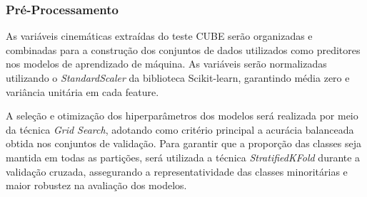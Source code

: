 \documentclass{article}
\begin{document}


\subsubsection{Pré-Processamento}

\noindent As variáveis cinemáticas extraídas do teste CUBE serão organizadas e combinadas para a construção dos conjuntos de dados utilizados como preditores nos modelos de aprendizado de máquina. As variáveis serão normalizadas utilizando o \textit{StandardScaler} da biblioteca Scikit-learn, garantindo média zero e variância unitária em cada feature.

A seleção e otimização dos hiperparâmetros dos modelos será realizada por meio da técnica \textit{Grid Search}, adotando como critério principal a acurácia balanceada obtida nos conjuntos de validação. Para garantir que a proporção das classes seja mantida em todas as partições, será utilizada a técnica \textit{StratifiedKFold} durante a validação cruzada, assegurando a representatividade das classes minoritárias e maior robustez na avaliação dos modelos.
\end{document}
